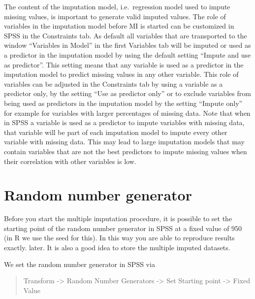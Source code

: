 \documentclass[
]{book}
\begin{document}
The content of the imputation model, i.e.~regression model used to impute missing values, is important to generate valid imputed values. The role of variables in the imputation model before MI is started can be customized in SPSS in the Constraints tab. As default all variables that are transported to the window ``Variables in Model'' in the first Variables tab will be imputed or used as a predictor in the imputation model by using the default setting ``Impute and use as predictor''. This setting means that any variable is used as a predictor in the imputation model to predict missing values in any other variable. This role of variables can be adjusted in the Constraints tab by using a variable as a predictor only, by the setting ``Use as predictor only'' or to exclude variables from being used as predictors in the imputation model by the setting ``Impute only'' for example for variables with larger percentages of missing data. Note that when in SPSS a variable is used as a predictor to impute variables with missing data, that variable will be part of each imputation model to impute every other variable with missing data. This may lead to large imputation models that may contain variables that are not the best predictors to impute missing values when their correlation with other variables is low.

\hypertarget{random-number-generator}{%
\section{Random number generator}\label{random-number-generator}}

Before you start the multiple imputation procedure, it is possible to set the starting point of the random number generator in SPSS at a fixed value of 950 (in R we use the seed for this). In this way you are able to reproduce results exactly. later. It is also a good idea to store the multiple imputed datasets.

We set the random number generator in SPSS via

\begin{quote}
Transform -\textgreater{} Random Number Generators -\textgreater{} Set Starting point -\textgreater{} Fixed Value
\end{quote}
\end{document}
